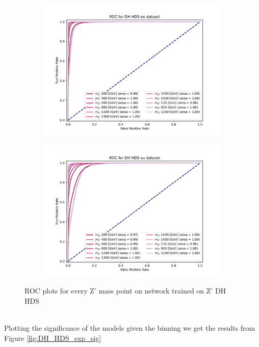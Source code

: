 \documentclass[14pt, a4paper]{book}
\begin{document}
\begin{figure}[!ht]
	\centering
	\begin{subfigure}[b]{0.49\textwidth}
      \centering
      \includegraphics[width=1\textwidth]{XGBoost/DH_HDS/ROC_ee.pdf}
      \end{subfigure}
   \hfill
   \begin{subfigure}[b]{0.49\textwidth}
      \centering
      \includegraphics[width=1\textwidth]{XGBoost/DH_HDS/ROC_uu.pdf}
      \end{subfigure}
   \caption{ROC plots for every Z' mass point on network trained on Z' DH HDS}\label{fig:DH_HDS_ROCS}
\end{figure}
\\Plotting the significance of the models given the binning we get the results from Figure \ref{fig:DH_HDS_exp_sig}
\end{document}
